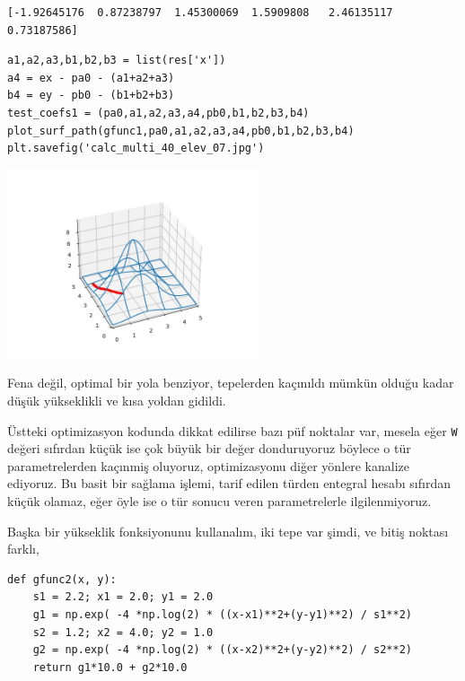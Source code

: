 \documentclass[12pt,fleqn]{article}\usepackage{../../common}
\begin{document}
\begin{verbatim}
[-1.92645176  0.87238797  1.45300069  1.5909808   2.46135117  0.73187586]
\end{verbatim}

\begin{verbatim}
a1,a2,a3,b1,b2,b3 = list(res['x'])
a4 = ex - pa0 - (a1+a2+a3)
b4 = ey - pb0 - (b1+b2+b3)
test_coefs1 = (pa0,a1,a2,a3,a4,pb0,b1,b2,b3,b4)
plot_surf_path(gfunc1,pa0,a1,a2,a3,a4,pb0,b1,b2,b3,b4)
plt.savefig('calc_multi_40_elev_07.jpg')
\end{verbatim}

\includegraphics[width=20em]{calc_multi_40_elev_07.jpg}

Fena değil, optimal bir yola benziyor, tepelerden kaçınıldı mümkün olduğu kadar
düşük yükseklikli ve kısa yoldan gidildi.

Üstteki optimizasyon kodunda dikkat edilirse bazı püf noktalar var, mesela eğer
\verb!W! değeri sıfırdan küçük ise çok büyük bir değer donduruyoruz böylece o
tür parametrelerden kaçınmiş oluyoruz, optimizasyonu diğer yönlere kanalize
ediyoruz. Bu basit bir sağlama işlemi, tarif edilen türden entegral hesabı
sıfırdan küçük olamaz, eğer öyle ise o tür sonucu veren parametrelerle
ilgilenmiyoruz.


Başka bir yükseklik fonksiyonunu kullanalım, iki tepe var şimdi, ve
bitiş noktası farklı,

\begin{verbatim}
def gfunc2(x, y):
    s1 = 2.2; x1 = 2.0; y1 = 2.0
    g1 = np.exp( -4 *np.log(2) * ((x-x1)**2+(y-y1)**2) / s1**2)
    s2 = 1.2; x2 = 4.0; y2 = 1.0
    g2 = np.exp( -4 *np.log(2) * ((x-x2)**2+(y-y2)**2) / s2**2)
    return g1*10.0 + g2*10.0
\end{verbatim}
\end{document}
